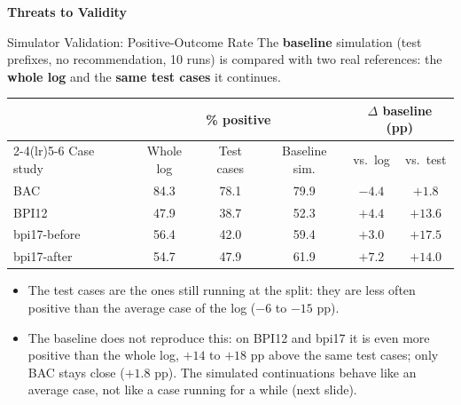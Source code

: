 \documentclass[aspectratio=169]{beamer} %
\begin{document}
\begin{frame}[plain,c]
    \centering
    \color{Darkcandyapplered}
    \Huge\textbf{Threats to Validity}
\end{frame}

\begin{frame}{Simulator Validation: Positive-Outcome Rate}
  \small
  The \textbf{baseline} simulation (test prefixes, no recommendation, 10 runs) is
  compared with two real references: the \textbf{whole log} and the \textbf{same test
  cases} it continues.
  \begin{center}
  \begin{tabular}{lccccc}
    \toprule
     & \multicolumn{3}{c}{\% positive} & \multicolumn{2}{c}{$\Delta$ baseline (pp)} \\
    \cmidrule(lr){2-4}\cmidrule(lr){5-6}
    Case study & Whole log & Test cases & Baseline sim. & vs.\ log & vs.\ test \\
    \midrule
    BAC          & 84.3 & 78.1 & 79.9 & $-4.4$ & $+1.8$  \\
    BPI12        & 47.9 & 38.7 & 52.3 & $+4.4$ & $+13.6$ \\
    bpi17-before & 56.4 & 42.0 & 59.4 & $+3.0$ & $+17.5$ \\
    bpi17-after  & 54.7 & 47.9 & 61.9 & $+7.2$ & $+14.0$ \\
    \bottomrule
  \end{tabular}
  \end{center}
  \footnotesize
  \begin{itemize}
    \item The test cases are the ones \alert{still running at the split}: they are less often positive than the
      average case of the log ($-6$ to $-15$ pp).
    \item The baseline does \alert{not} reproduce this: on BPI12 and bpi17 it is even more positive than the
      whole log, $+14$ to $+18$ pp above the same test cases; only BAC stays close ($+1.8$ pp). The simulated
      continuations behave like an average case, not like a case running for a while (next slide).
  \end{itemize}
\end{frame}
\end{document}
